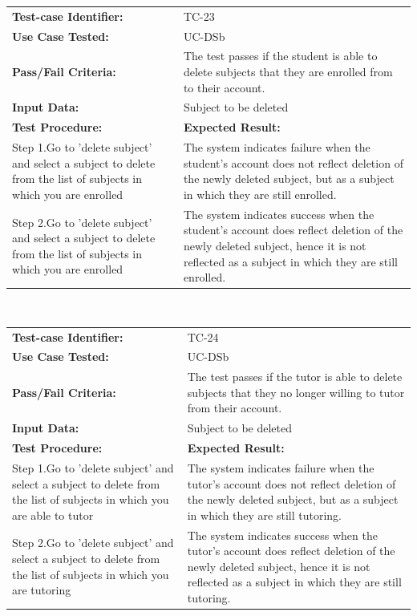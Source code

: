 \documentclass[12pt]{article}
\begin{document}
\begin{tabular}{| p{8cm} | p{8cm} |} \hline
	\textbf{Test-case Identifier:}& TC-23\\
	\textbf{Use Case Tested:}& UC-DSb\\
	\textbf{Pass/Fail Criteria:}& The test passes if the student is able to delete subjects that they are enrolled from to their account.\\
	\textbf{Input Data:}& Subject to be deleted\\\hline
	\textbf{Test Procedure:}& \textbf{Expected Result:} \\\hline
	Step 1.Go to 'delete subject' and select a subject to delete from the list of subjects in which you are enrolled & The system indicates failure when the student's account does not reflect deletion of the newly deleted subject, but as a subject in which they are still enrolled. \\
	Step 2.Go to 'delete subject' and select a subject to delete from the list of subjects in which you are enrolled & The system indicates success when the student's account does  reflect deletion of the newly deleted subject, hence it is not reflected  as a subject in which they are still enrolled.\\
		\hline
\end{tabular}
\\

\begin{tabular}{| p{8cm} | p{8cm} |} \hline
	\textbf{Test-case Identifier:}& TC-24\\
	\textbf{Use Case Tested:}& UC-DSb\\
	\textbf{Pass/Fail Criteria:}& The test passes if the tutor is able to delete subjects that they no longer willing to tutor from  their account.\\
	\textbf{Input Data:}& Subject to be deleted\\\hline
	\textbf{Test Procedure:}& \textbf{Expected Result:} \\\hline
	Step 1.Go to 'delete subject' and select a subject to delete from the list of subjects in which you are able to tutor & The system indicates failure when the tutor's account does not reflect deletion of the newly deleted subject, but as a subject in which they are still tutoring. \\
	Step 2.Go to 'delete subject' and select a subject to delete from the list of subjects in which you are tutoring & The system indicates success when the tutor's account does  reflect deletion of the newly deleted subject, hence it is not reflected  as a subject in which they are still tutoring.\\
		\hline
\end{tabular}
\\
\end{document}
